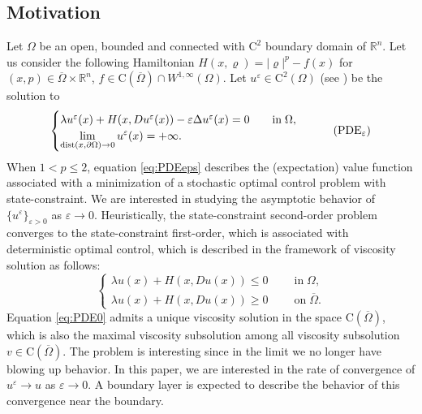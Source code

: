 \documentclass[11pt,reqno]{amsart}
\numberwithin{figure}{section}
\theoremstyle{plain}
\theoremstyle{remark}
\numberwithin{equation}{section}
\newcommand{\rmC}{\mathrm{C}}
\begin{document}
\subsection{Motivation} Let $\Omega$ be an open, bounded and connected with $\mathrm{C}^2$ boundary domain of $\mathbb{R}^n$. Let us consider the following Hamiltonian $ H(x,\varrho) = |\varrho|^p-f(x)$ for $(x,p)\in \overline{\Omega}\times \mathbb{R}^n$, $f\in \mathrm{C}(\overline{\Omega})\cap W^{1,\infty}(\Omega)$. Let $u^\varepsilon\in \mathrm{C}^2(\Omega)$ (see \cite{Lasry1989}) be the solution to 
\begin{equation}\label{eq:PDEeps}
    \begin{cases}
    \lambda u^\varepsilon(x) + H(x,Du^\varepsilon(x)) - \varepsilon \Delta u^\varepsilon(x) = 0 \qquad
    \text{in}\;\Omega, \vspace{0cm}\\
    \displaystyle  \lim_{\mathrm{dist}(x,\partial \Omega)\to 0} u^\varepsilon(x) = +\infty.
    \end{cases} \tag{PDE$_\varepsilon$}
\end{equation}
When $1<p\leq 2$, equation \eqref{eq:PDEeps} describes the (expectation) value function associated with a minimization of a stochastic optimal control problem with state-constraint. We are interested in studying the asymptotic behavior of $\{u^\varepsilon\}_{\varepsilon>0}$ as $\varepsilon\rightarrow 0$. Heuristically, the state-constraint second-order problem converges to the state-constraint first-order, which is associated with deterministic optimal control, which is described in the framework of viscosity solution as follows:
\begin{equation}\label{eq:PDE0}
    \begin{cases}
     \lambda u(x) + H(x,Du(x)) \leq 0\;\qquad\text{in}\;\Omega,\\
     \lambda u(x) + H(x,Du(x)) \geq 0\;\qquad\text{on}\;\overline{\Omega}.
    \end{cases} \tag{PDE$_0$}
\end{equation}
Equation \eqref{eq:PDE0} admits a unique viscosity solution in the space $\rmC(\overline{\Omega})$, which is also the maximal viscosity subsolution among all viscosity subsolution $v\in\rmC(\overline{\Omega})$. The problem is interesting since in the limit we no longer have blowing up behavior. In this paper, we are interested in the rate of convergence of $u^\varepsilon \to u$ as $\varepsilon\to 0$. A boundary layer is expected to describe the behavior of this convergence near the boundary.
\end{document}
